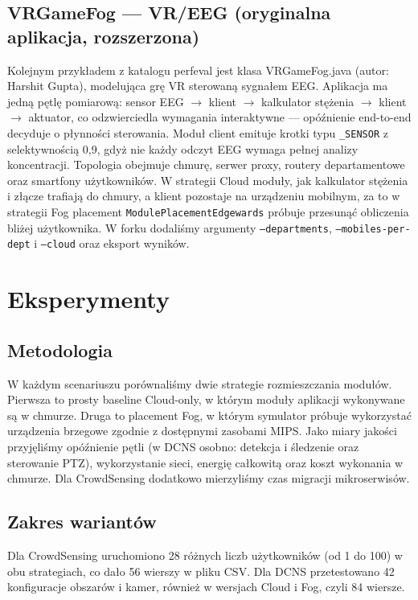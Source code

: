 \documentclass[
    oneside,            %
    left=2.5cm,         %
    right=2.5cm,        %
    top=2.5cm,          %
    bottom=3cm,         %
    bindingoffset=6mm,  %
    nohyphenation=false %
]{eiti/eiti-report}
\begin{document}
\subsection{VRGameFog --- VR/EEG (oryginalna aplikacja, rozszerzona)}
Kolejnym przykładem z katalogu perfeval jest klasa VRGameFog.java (autor: Harshit Gupta), modelująca grę VR sterowaną sygnałem EEG. Aplikacja ma jedną pętlę pomiarową: sensor EEG $\rightarrow$ klient $\rightarrow$ kalkulator stężenia $\rightarrow$ klient $\rightarrow$ aktuator, co odzwierciedla wymagania interaktywne — opóźnienie end-to-end decyduje o płynności sterowania. Moduł client emituje krotki typu \texttt{\_SENSOR} z selektywnością 0,9, gdyż nie każdy odczyt EEG wymaga pełnej analizy koncentracji.
Topologia obejmuje chmurę, serwer proxy, routery departamentowe oraz smartfony użytkowników. W strategii Cloud moduły, jak kalkulator stężenia i złącze trafiają do chmury, a klient pozostaje na urządzeniu mobilnym, za to w strategii Fog placement \texttt{ModulePlacementEdgewards} próbuje przesunąć obliczenia bliżej użytkownika. W forku dodaliśmy argumenty \texttt{--departments}, \texttt{--mobiles-per-dept} i \texttt{--cloud} oraz eksport wyników.

\section{Eksperymenty}
\subsection{Metodologia}
W każdym scenariuszu porównaliśmy dwie strategie rozmieszczania modułów. Pierwsza to prosty baseline Cloud-only, w którym moduły aplikacji wykonywane są w chmurze. Druga to placement Fog, w którym symulator próbuje wykorzystać urządzenia brzegowe zgodnie z dostępnymi zasobami MIPS.
Jako miary jakości przyjęliśmy opóźnienie pętli (w DCNS osobno: detekcja i śledzenie oraz sterowanie PTZ), wykorzystanie sieci, energię całkowitą oraz koszt wykonania w chmurze. Dla CrowdSensing dodatkowo mierzyliśmy czas migracji mikroserwisów.

\subsection{Zakres wariantów}
Dla CrowdSensing uruchomiono 28 różnych liczb użytkowników (od 1 do 100) w obu strategiach, co dało 56 wierszy w pliku CSV. Dla DCNS przetestowano 42 konfiguracje obszarów i kamer, również w wersjach Cloud i Fog, czyli 84 wiersze.
\end{document}
